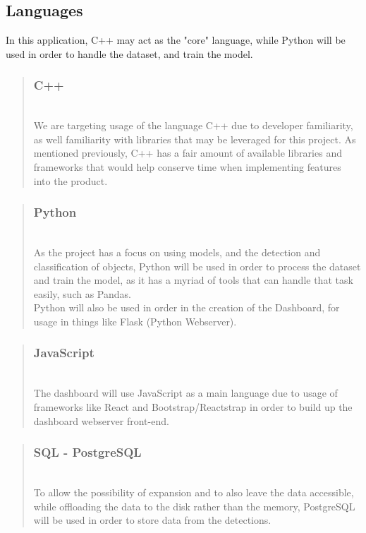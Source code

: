 \documentclass[conference]{IEEEtran}
\begin{document}
\subsection{Languages}
In this application, C++ may act as the "core" language, while Python will be used in order to handle the dataset, and train the model.\\
\begin{quote}
\subsubsection{C++}~\\
We are targeting usage of the language C++ due to developer familiarity, as well familiarity with libraries that may be leveraged for this project. 
As mentioned previously, C++ has a fair amount of available libraries and frameworks that would help conserve time when implementing features into the product.
\end{quote}
\begin{quote}
\subsubsection{Python}~\\
As the project has a focus on using models, and the detection and classification of objects, Python will be used in order to process the dataset and train the model, as it has a myriad of tools that can handle that task easily, such as Pandas.\\
Python will also be used in order in the creation of the Dashboard, for usage in things like Flask (Python Webserver).
\end{quote}
\begin{quote}
\subsubsection{JavaScript}~\\
The dashboard will use JavaScript as a main language due to usage of frameworks like React and Bootstrap/Reactstrap in order to build up the dashboard webserver front-end.
\end{quote}
\begin{quote}
\subsubsection{SQL - PostgreSQL}~\\
To allow the possibility of expansion and to also leave the data accessible, while offloading the data to the disk rather than the memory, PostgreSQL will be used in order to store data from the detections.
\end{quote}~\\
\end{document}
